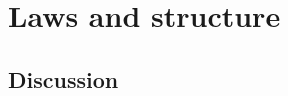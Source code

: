 \begin{comment}
of tightly and it checks whether X passes the test if so it lets our
country function cancion X otherwise it does not let it consume X
and instead it returns none none is the possible value that it can
return so that's important that in the case that our argument does
not pass the test we have to return something and we're not allowed
to let the country hunter consume that value and that's similar to
the partial function law if for fun tips if value does not pass the
test we're not allowing the factor to transform this value any further
so any further processing should not happen for that value and so
for the country functor this happens right here contra fighters conceal
values and so the are they should be guaranteed not to need to consume
values that don't pass the filter that's the main intuition behind
filtering the Contra factors and so here we define a specific type
constructor example eight which is C of L Z with Z equals string we
can do that with specific type without it we the only thing we have
to do is at I clamp the C of question mark Z so so that's the only
thing we have to do it here we can if we are willing to constrain
the parameter Z to be a fixed type then we can do it and we are doing
this here because we're about to run tests and for tests in any case
we need specific types so just to run the test I need to define the
Equality function that will compare two different values of contra
factor and since they're functions it's not immediately easy to compare
them we need to do it for all and run the functions on some arguments
and so I also have contra filterable laws implemented but this is
just for later logo we discussed these laws right now so now here
are some exercises for you which they are based on what we just have
covered {[}Music{]} they're very similar to the works examples I just
gave and after you do these exercises we will go on to the second
part of the tutorial where we will discuss the laws of functors in
more detail and in more depth we will discover why the laws are like
this however they can be simplified and how we can reason about filterable
factors in a much simpler 
\end{comment}


\section{Laws and structure}

\subsection{Discussion}

